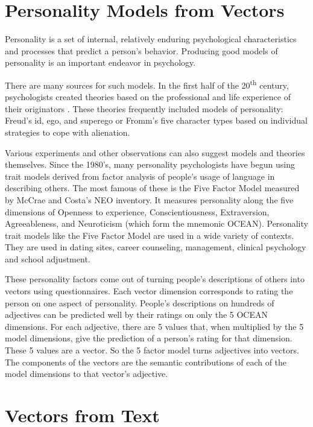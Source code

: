 \documentclass[eric_thesis.tex]{subfiles}
\begin{document}
\section{Personality Models from Vectors}
\label{sec:personalitymodelsfromvectors}
Personality is a set of internal, relatively enduring psychological 
characteristics and processes that predict a person's behavior. Producing good
models of personality is an important endeavor in psychology.

There are many sources for such models. In the first half of the 
20\textsuperscript{th} century, psychologists created theories based on the
professional and life experience of their originators 
. These theories frequently included models of
personality: Freud's id, ego, and superego or Fromm's five character types based 
on individual strategies to cope with alienation.

Various experiments and other observations can also suggest models and theories
themselves. Since the 1980's, many personality psychologists have begun using 
trait models derived from factor analysis of people's usage of language in 
describing others. The most famous of these is the Five Factor Model measured by 
McCrae and Costa's NEO inventory. It measures personality along the five 
dimensions of Openness to experience, Conscientiousness, Extraversion, 
Agreeableness, and Neuroticism (which form the mnemonic OCEAN). Personality 
trait models like the Five Factor Model are used in a wide variety of contexts. 
They are used in dating sites, career counseling, management, clinical 
psychology and school adjustment.

These personality factors come out of turning people's descriptions of others 
into vectors using questionnaires. Each vector dimension corresponds to rating 
the person on one aspect of personality. People's descriptions on hundreds of 
adjectives can be predicted well by their ratings on only the 5 OCEAN 
dimensions. For each adjective, there are 5 values that, when multiplied by the 
5 model dimensions, give the prediction of a person's rating for that dimension. 
These 5 values are a vector. So the 5 factor model turns adjectives into 
vectors. The components of the vectors are the semantic contributions of each of 
the model dimensions to that vector's adjective.

\section{Vectors from Text}
\end{document}
